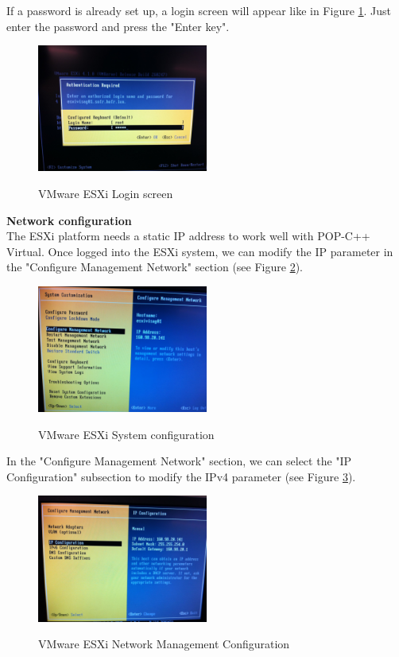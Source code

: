 If a password is already set up, a login screen will appear like in Figure \ref{fig:esxi_login}. Just enter the password and press the "Enter key".
\begin{figure}[ht]
	\caption{VMware ESXi Login screen}
  	\centering
	\includegraphics[width=0.5\textwidth]{./pic/esxi_8.jpg}
	\label{fig:esxi_login}
\end{figure}

\pagebreak
\textbf{Network configuration}\\
The ESXi platform needs a static IP address to work well with POP-C++ Virtual. Once logged into the ESXi system, we can modify the IP parameter in the "Configure Management Network" section (see Figure \ref{fig:esxi_sysconf}).

\begin{figure}[ht]
	\caption{VMware ESXi System configuration}
  	\centering
	\includegraphics[width=0.5\textwidth]{./pic/esxi_9.jpg}
	\label{fig:esxi_sysconf}
\end{figure}

In the "Configure Management Network" section, we can select the "IP Configuration" subsection to modify the IPv4 parameter (see Figure \ref{fig:esxi_sysconf_ip}).

\begin{figure}[ht]
	\caption{VMware ESXi Network Management Configuration}
  	\centering
	\includegraphics[width=0.5\textwidth]{./pic/esxi_10.jpg}
	\label{fig:esxi_sysconf_ip}
\end{figure}

